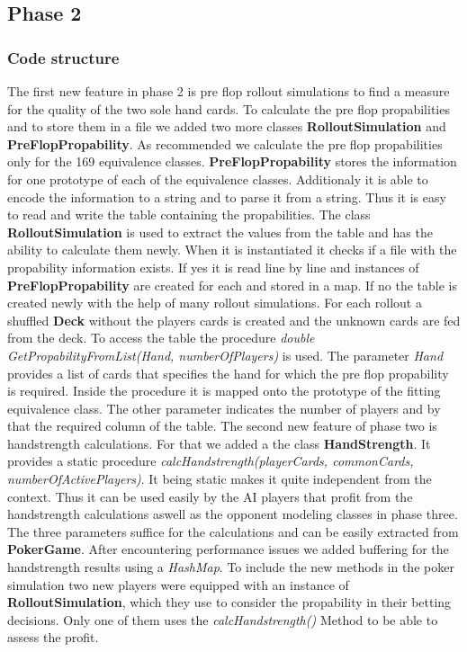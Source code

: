 \subsection{Phase 2}

\subsubsection{Code structure}
The first new feature in phase 2 is pre flop rollout simulations to find a measure for the quality of the two sole hand cards.
To calculate the pre flop propabilities and to store them in a file we added two more classes \textbf{RolloutSimulation} and \textbf{PreFlopPropability}. As recommended we calculate the pre flop propabilities only for the 169 equivalence classes. \textbf{PreFlopPropability} stores the information for one prototype of each of the equivalence classes. Additionaly it is able to encode the information to a string and to parse it from a string. Thus it is easy to read and write the table containing the propabilities. 
The class \textbf{RolloutSimulation} is used to extract the values from the table and has the ability to calculate them newly. When it is instantiated it checks if a file with the propability information exists. If yes it is read line by line and instances of \textbf{PreFlopPropability} are created for each and stored in a map. If no the table is created newly with the help of many rollout simulations. For each rollout a shuffled \textbf{Deck} without the players cards is created and the unknown cards are fed from the deck. To access the table the procedure \textit{double GetPropabilityFromList(Hand, numberOfPlayers)} is used. The parameter \textit{Hand} provides a list of cards that specifies the hand for which the pre flop propability is required. Inside the procedure it is mapped onto the prototype of the fitting equivalence class. The other parameter indicates the number of players and by that the required column of the table.
The second new feature of phase two is handstrength calculations. For that we added a the class \textbf{HandStrength}. It provides a static procedure \textit{calcHandstrength(playerCards, commonCards, numberOfActivePlayers)}. It being static makes it quite independent from the context. Thus it can be used easily by the AI players that profit from the handstrength calculations aswell as the opponent modeling classes in phase three. The three parameters suffice for the calculations and can be easily extracted from \textbf{PokerGame}. After encountering performance issues we added buffering for the handstrength results using a \textit{HashMap}.
To include the new methods in the poker simulation two new players were equipped with an instance of \textbf{RolloutSimulation}, which they use to consider the propability in their betting decisions. Only one of them uses the \textit{calcHandstrength()} Method to be able to assess the profit.


